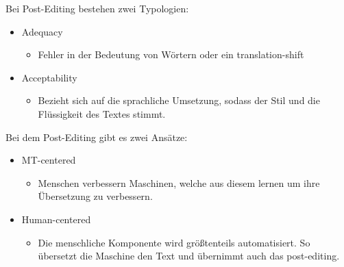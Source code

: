 \documentclass{article}
\begin{document}
	Bei Post-Editing bestehen zwei Typologien: \\
	\begin{itemize}
		\item{Adequacy}
		\begin{itemize}
			\item{Fehler in der Bedeutung von Wörtern oder ein translation-shift}
		\end{itemize}
		\item{Acceptability}
		\begin{itemize}
			\item{Bezieht sich auf die sprachliche Umsetzung, sodass der Stil und die Flüssigkeit des Textes stimmt.}
		\end{itemize}
	\end{itemize}

	Bei dem Post-Editing gibt es zwei Ansätze:	\\
	\begin{itemize}
		\item{MT-centered}
		\begin{itemize}
			\item{Menschen verbessern Maschinen, welche aus diesem lernen um ihre Übersetzung zu verbessern.}
		\end{itemize}
		\item{Human-centered}
		\begin{itemize}
			\item{Die menschliche Komponente wird größtenteils automatisiert. So übersetzt die Maschine den Text und übernimmt auch das post-editing.}
		\end{itemize}
	\end{itemize}
	


	
\end{document}

